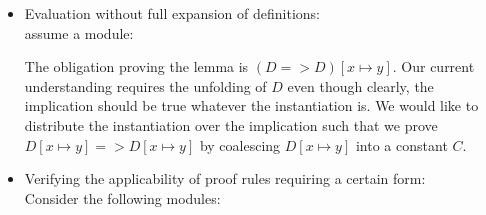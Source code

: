 \documentclass[a4paper]{article}
\begin{document}
\begin{itemize}
\item Evaluation without full expansion of definitions:\\
  assume a module:
\begin{parcolumns}{2}

\end{parcolumns}
The obligation proving the lemma is $(D => D)[x \mapsto y]$. Our current
 understanding requires the unfolding of $D$ even though clearly,
 the implication should be true whatever the instantiation is. We would
 like to distribute the instantiation over the implication such that we
 prove $D[x \mapsto y] => D[x \mapsto y]$ by coalescing $D[x \mapsto y]$
 into a constant $C$.
\item Verifying the applicability of proof rules requiring a certain form:\\
  Consider the following modules:
\begin{parcolumns}{2}


\end{parcolumns}


\end{itemize}
\end{document}
